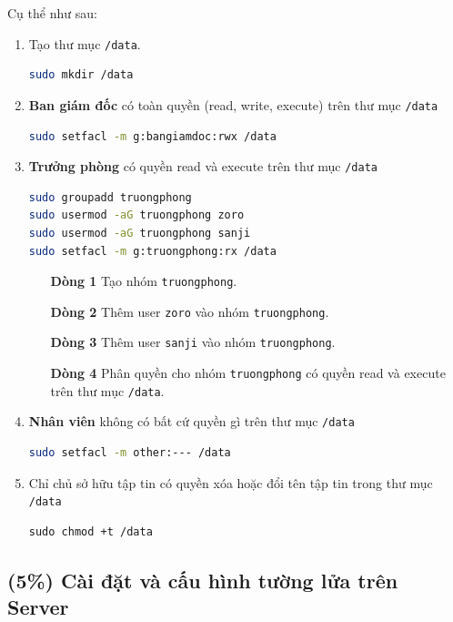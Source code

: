 \documentclass[a4paper, 11pt]{article}
\begin{document}
Cụ thể như sau:
\begin{enumerate}
    \item Tạo thư mục \texttt{/data}.
          \begin{lstlisting}[language=bash, caption=Tạo thư mục \texttt{/data}]
sudo mkdir /data
\end{lstlisting}
    \item \textbf{Ban giám đốc} có toàn quyền (read, write, execute) trên thư mục \texttt{/data}
          \begin{lstlisting}[language=bash, caption=Phân quyền cho ban giám đốc]
sudo setfacl -m g:bangiamdoc:rwx /data
\end{lstlisting}
    \item  \textbf{Trưởng phòng} có quyền read và execute trên thư mục \texttt{/data}
          \begin{lstlisting}[language=bash, caption=Phân quyền cho trưởng phòng]
sudo groupadd truongphong
sudo usermod -aG truongphong zoro
sudo usermod -aG truongphong sanji
sudo setfacl -m g:truongphong:rx /data
\end{lstlisting}

          \begin{itemize}
              \item [\textbf{Dòng 1}] Tạo nhóm \texttt{truongphong}.
              \item [\textbf{Dòng 2}] Thêm user \texttt{zoro} vào nhóm \texttt{truongphong}.
              \item [\textbf{Dòng 3}] Thêm user \texttt{sanji} vào nhóm \texttt{truongphong}.
              \item [\textbf{Dòng 4}] Phân quyền cho nhóm \texttt{truongphong} có quyền read và execute trên thư mục \texttt{/data}.
          \end{itemize}
    \item \textbf{Nhân viên} không có bất cứ quyền gì trên thư mục \texttt{/data}
          \begin{lstlisting}[language=bash, caption=Phân quyền cho nhân viên]
sudo setfacl -m other:--- /data
\end{lstlisting}
    \item Chỉ chủ sở hữu tập tin có quyền xóa hoặc đổi tên tập tin trong thư mục \texttt{/data}
          \begin{lstlisting}
sudo chmod +t /data
\end{lstlisting}
\end{enumerate}

\subsection{(5\%) Cài đặt và cấu hình tường lửa trên Server}
\end{document}
